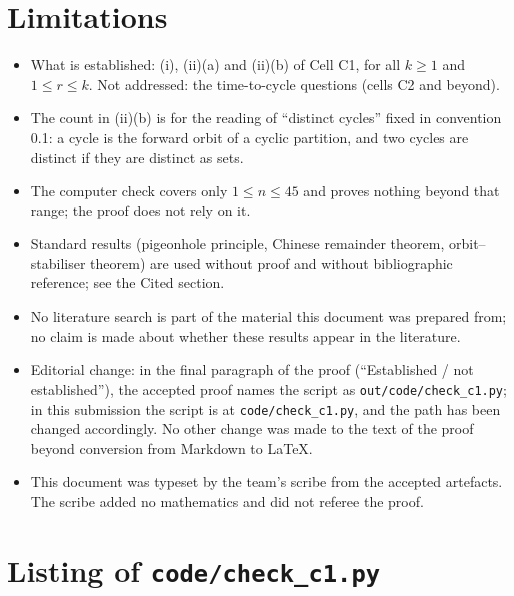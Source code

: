 \documentclass[11pt]{article}
\begin{document}
\section{Limitations}\label{sec:lim}

\begin{itemize}
\item What is established: (i), (ii)(a) and (ii)(b) of Cell C1, for all $k\ge1$ and $1\le r\le k$. Not
addressed: the time-to-cycle questions (cells C2 and beyond).
\item The count in (ii)(b) is for the reading of ``distinct cycles'' fixed in convention 0.1: a cycle is the
forward orbit of a cyclic partition, and two cycles are distinct if they are distinct as sets.
\item The computer check covers only $1\le n\le 45$ and proves nothing beyond that range; the proof does not
rely on it.
\item Standard results (pigeonhole principle, Chinese remainder theorem, orbit--stabiliser theorem) are used
without proof and without bibliographic reference; see the Cited section.
\item No literature search is part of the material this document was prepared from; no claim is made about
whether these results appear in the literature.
\item Editorial change: in the final paragraph of the proof (``Established / not established''), the accepted
proof names the script as \texttt{out/code/check\_c1.py}; in this submission the script is at
\texttt{code/check\_c1.py}, and the path has been changed accordingly. No other change was made to the text of
the proof beyond conversion from Markdown to \LaTeX.
\item This document was typeset by the team's scribe from the accepted artefacts. The scribe added no
mathematics and did not referee the proof.
\end{itemize}

\appendix
\section{Listing of \texttt{code/check\_c1.py}}
\end{document}

